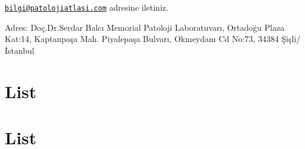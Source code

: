 \documentclass[
  letterpaper,
  DIV=11,
  numbers=noendperiod]{scrreprt}
\begin{document}
\href{mailto:bilgi@patolojiatlasi.com}{\nolinkurl{bilgi@patolojiatlasi.com}}
adresine iletiniz.

Adres: Doç.Dr.Serdar Balcı Memorial Patoloji Laboratuvarı, Ortadoğu
Plaza Kat:14, Kaptanpaşa Mah. Piyalepaşa Bulvarı, Okmeydanı Cd No:73,
34384 Şişli/İstanbul

\hypertarget{section-4}{%
\chapter{}\label{section-4}}

\hypertarget{list}{%
\chapter{List}\label{list}}

\hypertarget{list-1}{%
\chapter{List}\label{list-1}}
\end{document}
